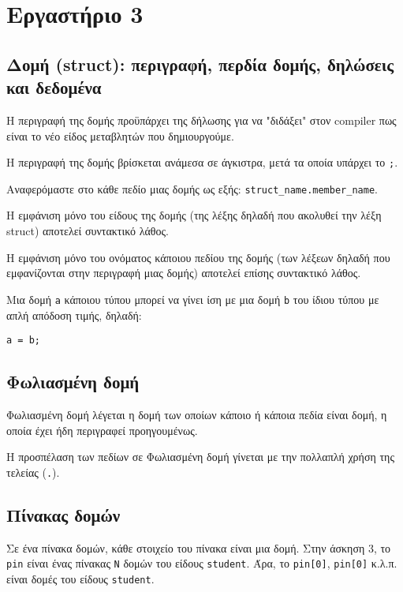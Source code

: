\documentclass[14pt, fleqn, leqno]{extreport}
\begin{document}
\chapter{Εργαστήριο 3}

\section{Δομή (struct): περιγραφή, περδία δομής, δηλώσεις και δεδομένα}

Η περιγραφή της δομής προϋπάρχει της δήλωσης για να "διδάξει" στον compiler πως είναι το νέο είδος μεταβλητών που δημιουργούμε.

Η περιγραφή της δομής βρίσκεται ανάμεσα σε άγκιστρα, μετά τα οποία υπάρχει το \lstinline{;}.

Αναφερόμαστε στο κάθε πεδίο μιας δομής ως εξής: \lstinline{struct_name.member_name}.

Η εμφάνιση μόνο του είδους της δομής (της λέξης δηλαδή που ακολυθεί την λέξη struct) αποτελεί συντακτικό λάθος.

Η εμφάνιση μόνο του ονόματος κάποιου πεδίου της δομής (των λέξεων δηλαδή που εμφανίζονται στην περιγραφή μιας δομής) αποτελεί επίσης συντακτικό λάθος.

Μια δομή \lstinline{a} κάποιου τύπου μπορεί να γίνει ίση με μια δομή \lstinline{b} του ίδιου τύπου με απλή απόδοση τιμής, δηλαδή:
\begin{center}
    \lstinline{a = b;}
\end{center}

\section{Φωλιασμένη δομή}

Φωλιασμένη δομή λέγεται η δομή των οποίων κάποιο ή κάποια πεδία είναι δομή, η οποία έχει ήδη περιγραφεί προηγουμένως.

Η προσπέλαση των πεδίων σε Φωλιασμένη δομή γίνεται με την πολλαπλή χρήση της τελείας (\lstinline{.}).

\section{Πίνακας δομών}

Σε ένα πίνακα δομών, κάθε στοιχείο του πίνακα είναι μια δομή. Στην άσκηση 3, το \lstinline{pin} είναι ένας πίνακας \lstinline{N} δομών του είδους \lstinline{student}. Άρα, το \lstinline{pin[0]}, \lstinline{pin[0]} κ.λ.π. είναι δομές του είδους \lstinline{student}.
\end{document}
